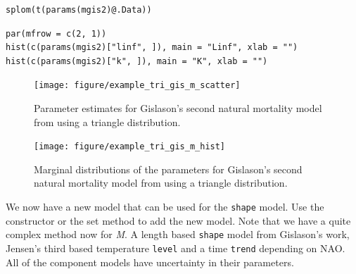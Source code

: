 \documentclass[a4paper,english,10pt]{article}\usepackage[]{graphicx}\usepackage[]{color}
\makeatletter
\newenvironment{kframe}{%
 \def\at@end@of@kframe{}%
 \ifinner\ifhmode%
  \def\at@end@of@kframe{\end{minipage}}%
  \begin{minipage}{\columnwidth}%
 \fi\fi%
 \def\FrameCommand##1{\hskip\@totalleftmargin \hskip-\fboxsep
 \colorbox{shadecolor}{##1}\hskip-\fboxsep
     \hskip-\linewidth \hskip-\@totalleftmargin \hskip\columnwidth}%
 \MakeFramed {\advance\hsize-\width
   \@totalleftmargin\z@ \linewidth\hsize
   \@setminipage}}%
 {\par\unskip\endMakeFramed%
 \at@end@of@kframe}
\newenvironment{knitrout}{}{} %
\newcommand{\code}[1]{{\texttt{#1}}}
\makeatother
\begin{document}
\begin{knitrout}
\color{fgcolor}\begin{kframe}
\begin{verbatim}
splom(t(params(mgis2)@.Data))
\end{verbatim}
\end{kframe}
\end{knitrout}


\begin{knitrout}
\color{fgcolor}\begin{kframe}
\begin{verbatim}
par(mfrow = c(2, 1))
hist(c(params(mgis2)["linf", ]), main = "Linf", xlab = "")
hist(c(params(mgis2)["k", ]), main = "K", xlab = "")
\end{verbatim}
\end{kframe}
\end{knitrout}


\begin{figure}[h]
\begin{knitrout}
\color{fgcolor}

{\centering \texttt{[image: figure/example\_tri\_gis\_m\_scatter]} 

}



\end{knitrout}

\caption{Parameter estimates for Gislason's second natural mortality model from using a triangle distribution.}
\label{fig:plot_tri_gis_m}
\end{figure}

\begin{figure}[h]
\begin{knitrout}
\color{fgcolor}

{\centering \texttt{[image: figure/example\_tri\_gis\_m\_hist]} 

}



\end{knitrout}

\caption{Marginal distributions of the parameters for Gislason's second natural mortality model from using a triangle distribution.}
\label{fig:plot_tri_gis_m_hist}
\end{figure}

We now have a new model that can be used for the \code{shape} model. Use the constructor or the set method to add the new model. Note that we have a quite complex method now for \emph{M}. A length based \code{shape} model from Gislason's work, Jensen's third based temperature \code{level} and a time \code{trend} depending on NAO. All of the component models have uncertainty in their parameters.
\end{document}
